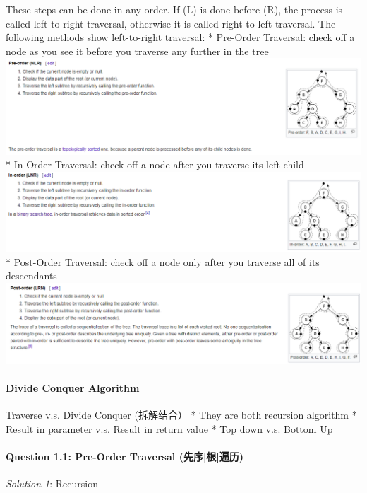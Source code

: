 \documentclass[11pt]{article}
\makeatletter
\def\maxwidth{\ifdim\Gin@nat@width>\linewidth\linewidth
    \else\Gin@nat@width\fi}
\let\Oldincludegraphics\includegraphics
\renewcommand{\includegraphics}[1]{\Oldincludegraphics[width=.8\maxwidth]{#1}}
\makeatother
\begin{document}
These steps can be done in any order. If (L) is done before (R), the
process is called left-to-right traversal, otherwise it is called
right-to-left traversal. The following methods show left-to-right
traversal: * Pre-Order Traversal: check off a node as you see it before
you traverse any further in the tree
\includegraphics{source/lesson6_binarytree_DFS_preorder.png} * In-Order
Traversal: check off a node after you traverse its left child
\includegraphics{source/lesson6_binarytree_DFS_inorder.png} * Post-Order
Traversal: check off a node only after you traverse all of its
descendants
\includegraphics{source/lesson6_binarytree_DFS_postorder.png}

    \paragraph{Divide Conquer Algorithm}\label{divide-conquer-algorithm}

Traverse v.s. Divide Conquer (拆解结合） * They are both recursion
algorithm * Result in parameter v.s. Result in return value * Top down
v.s. Bottom Up

    \paragraph{Question 1.1: Pre-Order Traversal
(先序{[}根{]}遍历)}\label{question-1.1-pre-order-traversal-ux5148ux5e8fux6839ux904dux5386}

\emph{Solution 1}: Recursion
\end{document}

